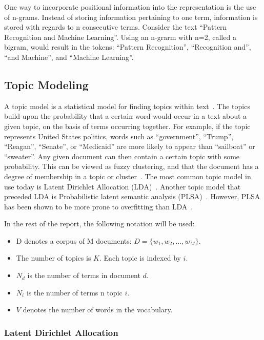 One way to incorporate positional information into the representation is the use of n-grams.
Instead of storing information pertaining to one term, information is stored with regards to n consecutive terms.
Consider the text ``Pattern Recognition and Machine Learning''.
Using an n-grarm with n=2, called a bigram, would result in the tokens: ``Pattern Recognition'', ``Recognition and'', ``and Machine'', and ``Machine Learning''.

\subsection{Topic Modeling}\label{sec:topic-modeling}

A topic model is a statistical model for finding topics within text~\cite{crain2012dimensionality}.
The topics build upon the probability that a certain word would occur in a text about a given topic, on the basis of terms occurring together.
For example, if the topic represents United States politics, words such as ``government'', ``Trump'', ``Reagan'', ``Senate'', or ``Medicaid'' are more likely to appear than ``sailboat'' or ``sweater''.
Any given document can then contain a certain topic with some probability.
This can be viewed as fuzzy clustering, and that the document has a degree of membership in a topic or cluster~\cite{crain2012dimensionality}.
The most common topic model in use today is Latent Dirichlet Allocation (LDA)~\cite{crain2012dimensionality}.
Another topic model that preceded LDA is Probabilistic latent semantic analysis (PLSA)~\cite{hofmann1999probabilistic}.
However, PLSA has been shown to be more prone to overfitting than LDA~\cite{crain2012dimensionality}.

In the rest of the report, the following notation will be used:

\begin{itemize}
    \item D denotes a corpus of M documents: $D = \{w_1, w_2, \ldots, w_M\}$.
    \item The number of topics is $K$. Each topic is indexed by $i$.
    \item $N_d$ is the number of terms in document $d$.
    \item $N_i$ is the number of terms n topic $i$.
    \item $V$ denotes the number of words in the vocabulary.
\end{itemize}

\subsubsection{Latent Dirichlet Allocation}

